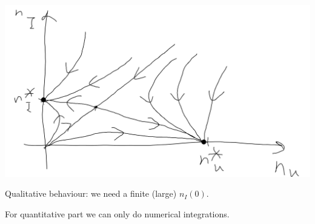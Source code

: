 \documentclass[a4paper]{article}
\begin{document}
\includegraphics[scale=0.5]{image/Bio_04.png}

Qualitative behaviour: we need a finite (large) $n_I(0)$.

For quantitative part we can only do numerical integrations.

\end{document}
